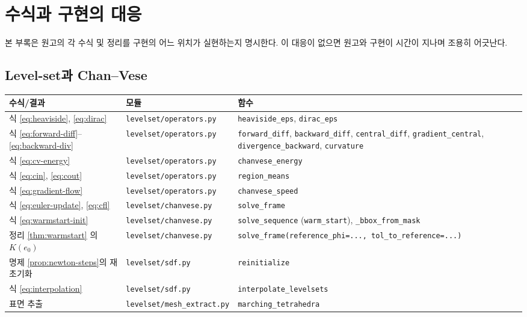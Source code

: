 \chapter{수식과 구현의 대응}
\label{app:code-map}

본 부록은 원고의 각 수식 및 정리를 구현의 어느 위치가 실현하는지 명시한다. 이 대응이
없으면 원고와 구현이 시간이 지나며 조용히 어긋난다.

\section{Level-set과 Chan--Vese}

\begin{longtable}{@{}p{3.6cm}p{4.6cm}p{5.2cm}@{}}
\toprule
수식/결과 & 모듈 & 함수 \\
\midrule
\endhead
식 \eqref{eq:heaviside}, \eqref{eq:dirac} & \texttt{levelset/operators.py}
  & \texttt{heaviside\_eps}, \texttt{dirac\_eps} \\
식 \eqref{eq:forward-diff}--\eqref{eq:backward-div} & \texttt{levelset/operators.py}
  & \texttt{forward\_diff}, \texttt{backward\_diff}, \texttt{central\_diff},
    \texttt{gradient\_central}, \texttt{divergence\_backward}, \texttt{curvature} \\
식 \eqref{eq:cv-energy} & \texttt{levelset/operators.py} & \texttt{chanvese\_energy} \\
식 \eqref{eq:cin}, \eqref{eq:cout} & \texttt{levelset/operators.py} & \texttt{region\_means} \\
식 \eqref{eq:gradient-flow} & \texttt{levelset/operators.py} & \texttt{chanvese\_speed} \\
식 \eqref{eq:euler-update}, \eqref{eq:cfl} & \texttt{levelset/chanvese.py} & \texttt{solve\_frame} \\
식 \eqref{eq:warmstart-init} & \texttt{levelset/chanvese.py}
  & \texttt{solve\_sequence} (\texttt{warm\_start}), \texttt{\_bbox\_from\_mask} \\
정리 \ref{thm:warmstart} 의 $K(e_0)$ & \texttt{levelset/chanvese.py}
  & \texttt{solve\_frame(reference\_phi=..., tol\_to\_reference=...)} \\
명제 \ref{prop:newton-steps}의 재초기화 & \texttt{levelset/sdf.py} & \texttt{reinitialize} \\
식 \eqref{eq:interpolation} & \texttt{levelset/sdf.py} & \texttt{interpolate\_levelsets} \\
표면 추출 & \texttt{levelset/mesh\_extract.py} & \texttt{marching\_tetrahedra} \\
\bottomrule
\end{longtable}

